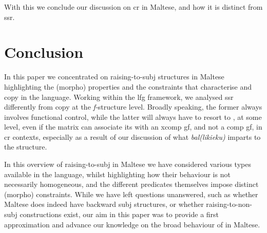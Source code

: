 \documentclass[output=paper]{LSP/langsci}
\begin{document}
With this we conclude our discussion on {\sc cr} in Maltese, and how it is distinct from {\sc ssr}.

\section{Conclusion}

In this paper we concentrated on raising-to-{\sc subj} structures in Maltese highlighting the (morpho) properties and the constraints that characterise  and copy  in the language. Working within the {\sc lfg} framework, we analysed {\sc ssr} differently from copy  at the \emph{f-}structure level. Broadly speaking, the former always involves functional control, while the latter will always have to resort to , at some level, even if the matrix  can associate its  with an {\sc xcomp gf}, and not a {\sc comp gf}, in {\sc cr} contexts, especially as a result of our discussion of what \emph{b\textcrh al(likieku)} imparts to the structure.

In this overview of raising-to-{\sc subj} in Maltese we have considered various  types available in the language, whilst highlighting how their behaviour is not necessarily homogeneous, and the different predicates themselves impose distinct (morpho) constraints. While we have left questions unanswered, such as whether Maltese does indeed have backward {\sc subj}  structures, or whether raising-to-non-{\sc subj} constructions exist, our aim in this paper was to provide a first approximation and advance our knowledge on the broad behaviour of  in Maltese.

  


\end{document}
